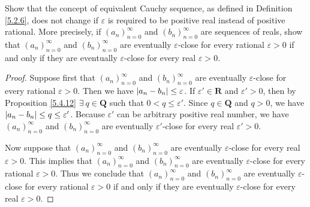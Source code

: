 \begin{exercise}\label{ex 6.1.10}
Show that the concept of equivalent Cauchy sequence, as defined in Definition \ref{5.2.6}, does not change if \(\varepsilon\) is required to be positive real instead of positive rational.
More precisely, if \((a_n)_{n = 0}^\infty\) and \((b_n)_{n = 0}^\infty\) are sequences of reals, show that \((a_n)_{n = 0}^\infty\) and \((b_n)_{n = 0}^\infty\) are eventually \(\varepsilon\)-close for every rational \(\varepsilon > 0\) if and only if they are eventually \(\varepsilon\)-close for every real \(\varepsilon > 0\).
\end{exercise}

\begin{proof}
Suppose first that \((a_n)_{n = 0}^\infty\) and \((b_n)_{n = 0}^\infty\) are eventually \(\varepsilon\)-close for every rational \(\varepsilon > 0\).
Then we have \(\abs*{a_n - b_n} \leq \varepsilon\).
If \(\varepsilon' \in \mathbf{R}\) and \(\varepsilon' > 0\), then by Proposition \ref{5.4.12} \(\exists\ q \in \mathbf{Q}\) such that \(0 < q \leq \varepsilon'\).
Since \(q \in \mathbf{Q}\) and \(q > 0\), we have \(\abs*{a_n - b_n} \leq q \leq \varepsilon'\).
Because \(\varepsilon'\) can be arbitrary positive real number, we have \((a_n)_{n = 0}^\infty\) and \((b_n)_{n = 0}^\infty\) are eventually \(\varepsilon'\)-close for every real \(\varepsilon' > 0\).

Now suppose that \((a_n)_{n = 0}^\infty\) and \((b_n)_{n = 0}^\infty\) are eventually \(\varepsilon\)-close for every real \(\varepsilon > 0\).
This implies that \((a_n)_{n = 0}^\infty\) and \((b_n)_{n = 0}^\infty\) are eventually \(\varepsilon\)-close for every rational \(\varepsilon > 0\).
Thus we conclude that \((a_n)_{n = 0}^\infty\) and \((b_n)_{n = 0}^\infty\) are eventually \(\varepsilon\)-close for every rational \(\varepsilon > 0\) if and only if they are eventually \(\varepsilon\)-close for every real \(\varepsilon > 0\).
\end{proof}